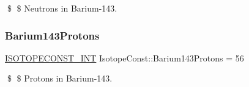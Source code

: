 \$ \$ Neutrons in Barium-\/143. \mbox{\label{group___isotope_const-_barium-_ba143_ga164f350473e5c987da36e2952803f43b}} 
\subsubsection{\texorpdfstring{Barium143\+Protons}{Barium143Protons}}
{\footnotesize\ttfamily \mbox{\hyperlink{group___isotope_const-_macros_ga5f18360b3e99483a35c32d789e62621c}{I\+S\+O\+T\+O\+P\+E\+C\+O\+N\+S\+T\+\_\+\+I\+NT}} Isotope\+Const\+::\+Barium143\+Protons = 56}

\$ \$ Protons in Barium-\/143. 